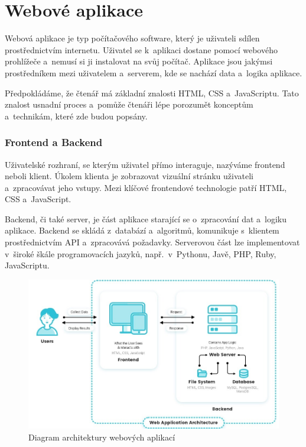 \section{Webové aplikace}

Webová aplikace je typ počítačového software, který je uživateli sdílen prostřednictvím internetu. 
Uživatel se k~aplikaci dostane pomocí webového prohlížeče a~nemusí si ji instalovat na svůj počítač. 
Aplikace jsou jakýmsi prostředníkem mezi uživatelem a~serverem, kde se nachází data a~logika aplikace.\cite{codeacademywebapp}

Předpokládáme, že čtenář má základní znalosti HTML, CSS a~JavaScriptu. 
Tato znalost usnadní proces a~pomůže čtenáři lépe porozumět konceptům a~technikám, které zde budou popsány.

\subsubsection*{Frontend a Backend}

Uživatelské rozhraní, se kterým uživatel přímo interaguje, nazýváme frontend neboli klient.
Úkolem klienta je zobrazovat vizuální stránku uživateli a~zpracovávat jeho vstupy. 
Mezi klíčové frontendové technologie patří HTML, CSS a~JavaScript.

Backend, či také server, je část aplikace starající se o~zpracování dat a~logiku aplikace. 
Backend se skládá z~databází a~algoritmů, komunikuje s~klientem prostřednictvím API a~zpracovává požadavky. 
Serverovou část lze implementovat v~široké škále programovacích jazyků, např.~v~Pythonu, Javě, PHP, Ruby, JavaScriptu.\cite{stateofartframeworks}

\begin{figure}[htb]
	\centering
		\includegraphics[width=1\textwidth]{images/webapparchitecture.jpg}
	\caption[Diagram architektury webových aplikací]{Diagram architektury webových aplikací \cite{webappsarchitecture}}
	\label{fig:webappsarchitecture}
\end{figure}

